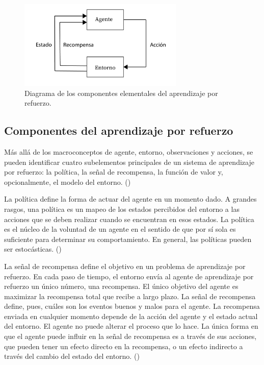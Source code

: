 \begin{figure}[ht!]
    \centering
    \includegraphics[width=0.7\textwidth]{Graphics/rl-elements.png}
    \caption{Diagrama de los componentes elementales del aprendizaje por refuerzo.}
    \label{fig:rl-elements}
\end{figure}

\subsection{Componentes del aprendizaje por refuerzo}

Más allá de los macroconceptos de agente, entorno, observaciones y acciones, se pueden identificar cuatro subelementos principales de un sistema de aprendizaje por refuerzo: la política, la señal de recompensa, la función de valor y, opcionalmente, el modelo del entorno. (\cite{sutton1998introduction})

La política define la forma de actuar del agente en un momento dado. A grandes rasgos, una política es un mapeo de los estados percibidos del entorno a las acciones que se deben realizar cuando se encuentran en esos estados. La política es el núcleo de la voluntad de un agente en el sentido de que por sí sola es suficiente para determinar su comportamiento. En general, las políticas pueden ser estocásticas. (\cite{sutton1998introduction})

La señal de recompensa define el objetivo en un problema de aprendizaje por refuerzo. En cada paso de tiempo, el entorno envía al agente de aprendizaje por refuerzo un único número, una recompensa. El único objetivo del agente es maximizar la recompensa total que recibe a largo plazo. La señal de recompensa define, pues, cuáles son los eventos buenos y malos para el agente. La recompensa enviada en cualquier momento depende de la acción del agente y el estado actual del entorno. El agente no puede alterar el proceso que lo hace. La única forma en que el agente puede influir en la señal de recompensa es a través de sus acciones, que pueden tener un efecto directo en la recompensa, o un efecto indirecto a través del cambio del estado del entorno. (\cite{sutton1998introduction})

